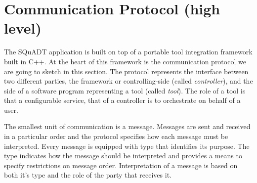 \documentclass{article}
\newcommand{\squadt}{SQuADT\xspace}
\begin{document}

%
%   
%

 \section{Communication Protocol (high level)} \label{s:message_definitions}

  The \squadt application is built on top of a portable tool integration
  framework built in C++. At the heart of this framework is the communication
  protocol we are going to sketch in this section. The protocol represents the
  interface between two different parties, the framework or controlling-side
  (called \textit{controller}), and the side of a software program representing
  a tool (called \textit{tool}). The role of a tool is that a configurable
  service, that of a controller is to orchestrate on behalf of a user.

  The smallest unit of communication is a message. Messages are sent and
  received in a particular order and the protocol specifies how each message
  must be interpreted. Every message is equipped with type that identifies its
  purpose.  The type indicates how the message should be interpreted and
  provides a means to specify restrictions on message order. Interpretation of
  a message is based on both it's type and the role of the party that receives
  it.
\end{document}

